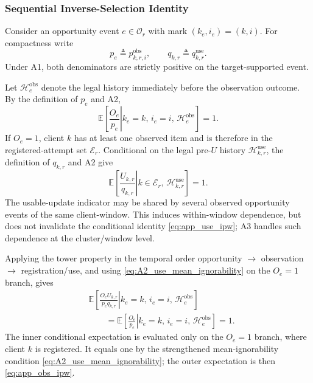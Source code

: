 \documentclass[letterpaper,journal]{IEEEtran}
\begin{document}
\subsubsection{Sequential Inverse-Selection Identity}

Consider an opportunity event $e\in\mathcal{O}_r$ with mark
$(k_e,i_e)=(k,i)$.  For compactness write
\begin{equation}
    p_e
    \triangleq
    p^{\mathrm{obs}}_{k,r,i},
    \qquad
    q_{k,r}
    \triangleq
    q^{\mathrm{use}}_{k,r}.
    \label{eq:app_pq_short}
\end{equation}
Under A1, both denominators are strictly positive on the target-supported event.

Let $\mathcal{H}^{\mathrm{obs}}_e$ denote the legal history immediately before
the observation outcome.  By the definition of $p_e$ and A2,
\begin{equation}
    \mathbb{E}
    \left[
    \left.
    \frac{O_e}{p_e}
    \right|
    k_e=k,\,
    i_e=i,\,
    \mathcal{H}^{\mathrm{obs}}_e
    \right]
    =1.
    \label{eq:app_obs_ipw}
\end{equation}
If $O_e=1$, client $k$ has at least one observed item and is therefore in the
registered-attempt set $\mathcal{E}_r$.  Conditional on the legal pre-$U$
history $\mathcal{H}^{\mathrm{use}}_{k,r}$, the definition of $q_{k,r}$ and A2
give
\begin{equation}
    \mathbb{E}
    \left[
    \left.
    \frac{U_{k,r}}{q_{k,r}}
    \right|
    k\in\mathcal{E}_r,\,
    \mathcal{H}^{\mathrm{use}}_{k,r}
    \right]
    =1.
    \label{eq:app_use_ipw}
\end{equation}
The usable-update indicator may be shared by several observed opportunity
events of the same client-window.  This induces within-window dependence, but
does not invalidate the conditional identity
\eqref{eq:app_use_ipw}; A3 handles such dependence at the
cluster/window level.

Applying the tower property in the temporal order
opportunity $\rightarrow$ observation $\rightarrow$ registration/use, and using
\eqref{eq:A2_use_mean_ignorability} on the $O_e=1$ branch, gives
\begin{align}
 &\mathbb{E}\!\left[
 \left.
 \frac{O_eU_{k,r}}{p_eq_{k,r}}
 \right|
 k_e=k,\,i_e=i,\,\mathcal{H}^{\mathrm{obs}}_e
 \right]
 \nonumber\\
 &\qquad=
 \mathbb{E}\!\left[
 \left.
 \frac{O_e}{p_e}
 \right|
 k_e=k,\,i_e=i,\,\mathcal{H}^{\mathrm{obs}}_e
 \right]
 =1.
 \label{eq:app_sequential_identity}
\end{align}
The inner conditional expectation is evaluated only on the $O_e=1$ branch,
where client $k$ is registered.  It equals one by the strengthened
mean-ignorability condition \eqref{eq:A2_use_mean_ignorability}; the outer
expectation is then \eqref{eq:app_obs_ipw}.
\end{document}
